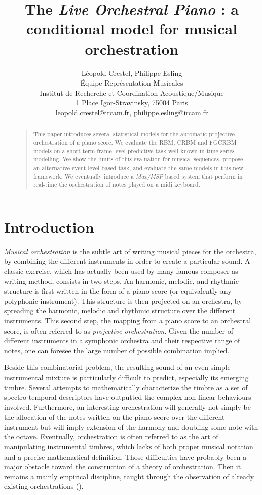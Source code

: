 \documentclass[letterpaper]{article}
\title{The \textit{Live Orchestral Piano} : a conditional model for musical orchestration}
\author{L\'eopold Crestel, Philippe Esling\\
\'Equipe Repr\'esentation Musicales\\
Institut de Recherche et Coordination Acoustique/Musique\\
1 Place Igor-Stravinsky, 75004 Paris\\
leopold.crestel@ircam.fr, philippe.esling@ircam.fr\\
}
\begin{document}
 
\maketitle
\begin{abstract}
\begin{quote}
This paper introduces several statistical models for the automatic projective orchestration of a piano score. We evaluate the RBM, CRBM and FGCRBM models on a short-term frame-level predictive task well-known in time-series modelling. We show the limits of this evaluation for musical sequences, propose an alternative event-level based task, and evaluate the same models in this new framework. We eventually introduce a \textit{Max/MSP} based system that perform in real-time the orchestration of notes played on a midi keyboard.
\end{quote}
\end{abstract}

\section{Introduction}
\textit{Musical orchestration} is the subtle art of writing musical pieces for the orchestra, by combining the different instruments in order to create a particular sound. A classic exercise, which has actually been used by many famous composer as writing method, consists in two steps. An harmonic, melodic, and rhythmic structure is first written in the form of a piano score (or equivalently any polyphonic instrument). This structure is then projected on an orchestra, by spreading the harmonic, melodic and rhythmic structure over the different instruments. This second step, the mapping from a piano score to an orchestral score, is often referred to as \textit{projective orchestration}. Given the number of different instruments in a symphonic orchestra and their respective range of notes, one can foresee the large number of possible combination implied.

Beside this combinatorial problem, the resulting sound of an even simple instrumental mixture is particularly difficult to predict, especially its emerging timbre. Several attempts to mathematically characterize the timbre as a set of spectro-temporal descriptors have outputted the complex non linear behaviours involved. Furthermore, an interesting orchestration will generally not simply be the allocation of the notes written on the piano score over the different instrument but will imply extension of the harmony and doubling some note with the octave. Eventually, orchestration is often referred to as the art of manipulating instrumental timbres, which lacks of both proper musical notation and a precise mathematical definition.
Those difficulties have probably been a major obstacle toward the construction of a theory of orchestration. Then it remains a mainly empirical discipline, taught through the observation of already existing orchestrations (\cite{piston-orch}).
\end{document}
